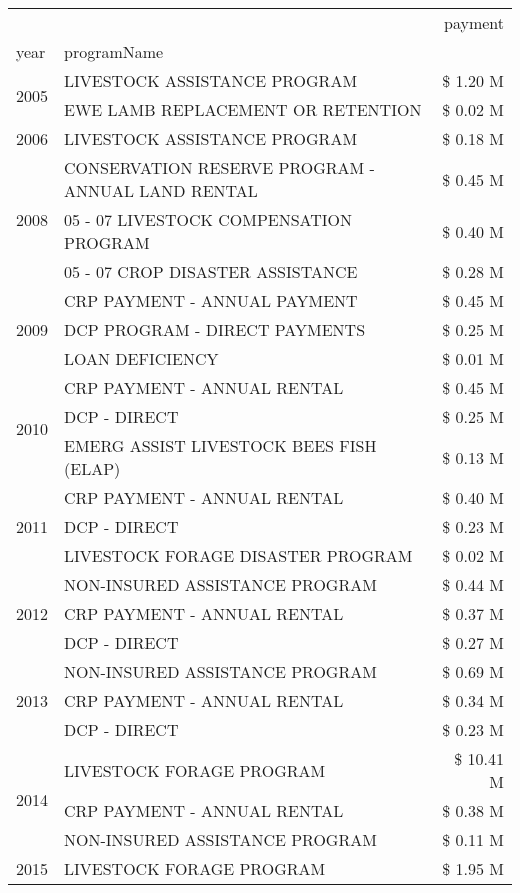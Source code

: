 \begin{tabular}{llr}
\toprule
 &  & payment \\
year & programName &  \\
\midrule
\multirow[t]{2}{*}{2005} & LIVESTOCK ASSISTANCE PROGRAM & \$ 1.20 M \\
 & EWE LAMB REPLACEMENT OR RETENTION & \$ 0.02 M \\
\cline{1-3}
2006 & LIVESTOCK ASSISTANCE PROGRAM & \$ 0.18 M \\
\cline{1-3}
\multirow[t]{3}{*}{2008} & CONSERVATION RESERVE PROGRAM - ANNUAL LAND RENTAL & \$ 0.45 M \\
 & 05 - 07 LIVESTOCK COMPENSATION PROGRAM & \$ 0.40 M \\
 & 05 - 07 CROP DISASTER ASSISTANCE & \$ 0.28 M \\
\cline{1-3}
\multirow[t]{3}{*}{2009} & CRP PAYMENT - ANNUAL PAYMENT & \$ 0.45 M \\
 & DCP PROGRAM - DIRECT PAYMENTS & \$ 0.25 M \\
 & LOAN DEFICIENCY & \$ 0.01 M \\
\cline{1-3}
\multirow[t]{3}{*}{2010} & CRP PAYMENT - ANNUAL RENTAL & \$ 0.45 M \\
 & DCP - DIRECT & \$ 0.25 M \\
 & EMERG ASSIST LIVESTOCK BEES FISH (ELAP) & \$ 0.13 M \\
\cline{1-3}
\multirow[t]{3}{*}{2011} & CRP PAYMENT - ANNUAL RENTAL & \$ 0.40 M \\
 & DCP - DIRECT & \$ 0.23 M \\
 & LIVESTOCK FORAGE DISASTER PROGRAM & \$ 0.02 M \\
\cline{1-3}
\multirow[t]{3}{*}{2012} & NON-INSURED ASSISTANCE PROGRAM & \$ 0.44 M \\
 & CRP PAYMENT - ANNUAL RENTAL & \$ 0.37 M \\
 & DCP - DIRECT & \$ 0.27 M \\
\cline{1-3}
\multirow[t]{3}{*}{2013} & NON-INSURED ASSISTANCE PROGRAM & \$ 0.69 M \\
 & CRP PAYMENT - ANNUAL RENTAL & \$ 0.34 M \\
 & DCP - DIRECT & \$ 0.23 M \\
\cline{1-3}
\multirow[t]{3}{*}{2014} & LIVESTOCK FORAGE PROGRAM & \$ 10.41 M \\
 & CRP PAYMENT - ANNUAL RENTAL & \$ 0.38 M \\
 & NON-INSURED ASSISTANCE PROGRAM & \$ 0.11 M \\
\cline{1-3}
\multirow[t]{3}{*}{2015} & LIVESTOCK FORAGE PROGRAM & \$ 1.95 M \\

\end{tabular}
